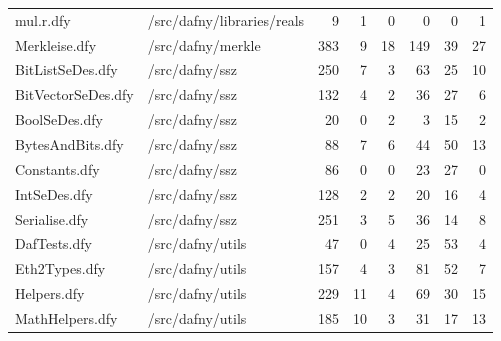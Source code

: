 \documentclass[a4paper, 12pt]{article}
\begin{document}
\begin{tabular}{llrrrrrr}
                       mul.r.dfy &                      /src/dafny/libraries/reals &     9 &         1 &                0 &              0 &              0 &       1 \\
                   Merkleise.dfy &                               /src/dafny/merkle &   383 &         9 &               18 &            149 &             39 &      27 \\
                BitListSeDes.dfy &                                  /src/dafny/ssz &   250 &         7 &                3 &             63 &             25 &      10 \\
              BitVectorSeDes.dfy &                                  /src/dafny/ssz &   132 &         4 &                2 &             36 &             27 &       6 \\
                   BoolSeDes.dfy &                                  /src/dafny/ssz &    20 &         0 &                2 &              3 &             15 &       2 \\
                BytesAndBits.dfy &                                  /src/dafny/ssz &    88 &         7 &                6 &             44 &             50 &      13 \\
                   Constants.dfy &                                  /src/dafny/ssz &    86 &         0 &                0 &             23 &             27 &       0 \\
                    IntSeDes.dfy &                                  /src/dafny/ssz &   128 &         2 &                2 &             20 &             16 &       4 \\
                   Serialise.dfy &                                  /src/dafny/ssz &   251 &         3 &                5 &             36 &             14 &       8 \\
                    DafTests.dfy &                                /src/dafny/utils &    47 &         0 &                4 &             25 &             53 &       4 \\
                   Eth2Types.dfy &                                /src/dafny/utils &   157 &         4 &                3 &             81 &             52 &       7 \\
                     Helpers.dfy &                                /src/dafny/utils &   229 &        11 &                4 &             69 &             30 &      15 \\
                 MathHelpers.dfy &                                /src/dafny/utils &   185 &        10 &                3 &             31 &             17 &      13 \\

\end{tabular}
\end{document}
